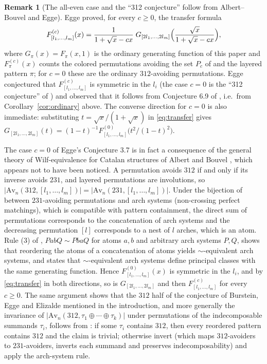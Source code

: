 \documentclass[11pt]{amsart}
\theoremstyle{definition}
\newtheorem{remark}[theorem]{Remark}
\newcommand{\ds}{\oplus}
\begin{document}
\begin{remark}[The all-even case and the ``312 conjecture'' follow from Albert--Bouvel and Egge]\label{rem:AB}
Egge \cite[Theorem 3.3]{Egge2007} proved, for every $c\ge0$, the transfer formula
\begin{equation}\label{eq:transfer}
F^{(c)}_{[l_1,\dots,l_m]}(x)=\frac{1}{1+\sqrt x-cx}\;G_{[2l_1,\dots,2l_m]}\Bigl(\frac{\sqrt x}{1+\sqrt x-cx}\Bigr),
\end{equation}
where $G_\pi(x)=F_\pi(x,1)$ is the ordinary generating function of this paper and $F^{(c)}_\pi(x)$ counts the colored permutations avoiding the set $P_c$ of \cite{Egge2007} and the layered pattern $\pi$; for $c=0$ these are the ordinary $312$-avoiding permutations. Egge conjectured \cite[Conjecture 3.7]{Egge2007} that $F^{(c)}_{[l_1,\dots,l_m]}$ is symmetric in the $l_i$ (the case $c=0$ is the ``312 conjecture'' of \cite{EggeSlides2026}) and observed that it follows from Conjecture 6.9 of \cite{Egge2004}, i.e.\ from Corollary~\ref{cor:ordinary} above. The converse direction for $c=0$ is also immediate: substituting $t=\sqrt x/(1+\sqrt x)$ in \eqref{eq:transfer} gives $G_{[2l_1,\dots,2l_m]}(t)=(1-t)^{-1}F^{(0)}_{[l_1,\dots,l_m]}\bigl(t^2/(1-t)^2\bigr)$.

The case $c=0$ of Egge's Conjecture 3.7 is in fact a consequence of the general theory of Wilf-equivalence for Catalan structures of Albert and Bouvel \cite{AlbertBouvel2015}, which appears not to have been noticed. A permutation avoids $312$ if and only if its inverse avoids $231$, and layered permutations are involutions, so $|\mathrm{Av}_n(312,[l_1,\dots,l_m])|=|\mathrm{Av}_n(231,[l_1,\dots,l_m])|$. Under the bijection of \cite[\S2]{AlbertBouvel2015} between $231$-avoiding permutations and arch systems (non-crossing perfect matchings), which is compatible with pattern containment, the direct sum of permutations corresponds to the concatenation of arch systems and the decreasing permutation $[l]$ corresponds to a nest of $l$ arches, which is an atom. Rule (3) of \cite[Definition 7]{AlbertBouvel2015}, $PabQ\sim PbaQ$ for atoms $a,b$ and arbitrary arch systems $P,Q$, shows that reordering the atoms of a concatenation of atoms yields $\sim$-equivalent arch systems, and \cite[Theorem 8]{AlbertBouvel2015} states that $\sim$-equivalent arch systems define principal classes with the same generating function. Hence $F^{(0)}_{[l_1,\dots,l_m]}(x)$ is symmetric in the $l_i$, and by \eqref{eq:transfer} in both directions, so is $G_{[2l_1,\dots,2l_m]}$ and then $F^{(c)}_{[l_1,\dots,l_m]}$ for every $c\ge0$. The same argument shows that the $312$ half of the conjecture of Burstein, Egge and Elizalde mentioned in the introduction, and more generally the invariance of $|\mathrm{Av}_n(312,\tau_1\ds\cdots\ds\tau_k)|$ under permutations of the indecomposable summands $\tau_i$, follows from \cite{AlbertBouvel2015}: if some $\tau_i$ contains $312$, then every reordered pattern contains $312$ and the claim is trivial; otherwise invert (which maps $312$-avoiders to $231$-avoiders, inverts each summand and preserves indecomposability) and apply the arch-system rule.


\end{remark}
\end{document}
